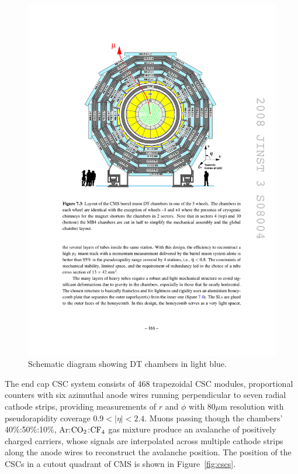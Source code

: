 \begin{figure}[tbh]
\centering
\includegraphics[width=5in]{figures/DTs.pdf}
\caption{Schematic diagram showing DT chambers in light blue.}
\label{fig:DTs}
\end{figure}

\indent The end cap CSC system consists of 468 trapezoidal CSC modules, proportional counters with six azimuthal anode wires running perpendicular to seven radial cathode strips, providing measurements of $r$ and $\phi$ with $80 \mu$m resolution with pseudorapidity coverage $0.9 < |\eta| < 2.4$. Muons passing though the chambers' 40\%:50\%:10\%, Ar:$\rm{CO}_2$:$\rm{CF}_4$ gas mixture produce an avalanche of positively charged carriers, whose signals are interpolated across multiple cathode strips along the anode wires to reconstruct the avalanche position. The position of the CSCs in a cutout quadrant of CMS is shown in Figure~\ref{fig:cscs}.

